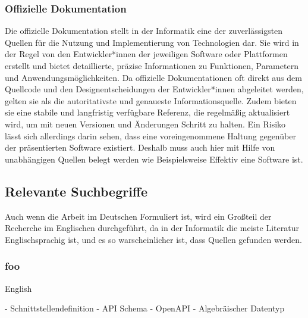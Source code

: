 \subsubsection{Offizielle Dokumentation}

Die offizielle Dokumentation stellt in der Informatik eine der zuverlässigsten Quellen für die Nutzung und Implementierung 
von Technologien dar.
Sie wird in der Regel von den Entwickler*innen der jeweiligen Software oder Plattformen erstellt und bietet detaillierte, 
präzise Informationen zu Funktionen, Parametern und Anwendungsmöglichkeiten. 
Da offizielle Dokumentationen oft direkt aus dem Quellcode und den Designentscheidungen der Entwickler*innen abgeleitet werden, 
gelten sie als die autoritativste und genaueste Informationsquelle.
Zudem bieten sie eine stabile und langfristig verfügbare Referenz,
die regelmäßig aktualisiert wird, um mit neuen Versionen und Änderungen Schritt zu halten.
Ein Risiko lässt sich allerdings darin sehen, dass eine voreingenommene Haltung gegenüber der präsentierten Software existiert.
Deshalb muss auch hier mit Hilfe von unabhängigen Quellen belegt werden wie Beispielsweise Effektiv eine Software ist.

\subsection{Relevante Suchbegriffe}

Auch wenn die Arbeit im Deutschen Formuliert ist, wird ein Großteil der Recherche im Englischen
durchgeführt, da in der Informatik die meiste Literatur Englischsprachig ist, und es so warscheinlicher ist,
dass Quellen gefunden werden.

\subsubsection{foo}



English

- Schnittstellendefinition
- API Schema
- OpenAPI
- Algebräischer Datentyp
